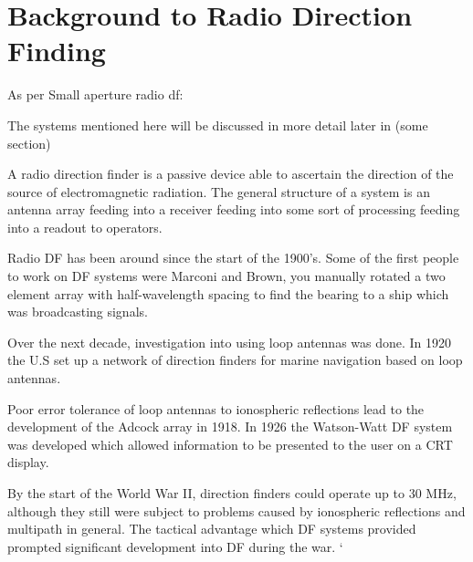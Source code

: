 \chapter{Background to Radio Direction Finding}
As per Small aperture radio df:

The systems mentioned here will be discussed in more detail later in (some section)

A radio direction finder is a passive device able to ascertain the direction of the source of electromagnetic radiation. 
The general structure of a system is an antenna array feeding into a receiver feeding into some sort of processing feeding into a readout to operators.

Radio DF has been around since the start of the 1900's. Some of the first people to work on DF  systems were Marconi and Brown, you manually rotated a two element array with half-wavelength spacing to find the bearing to a ship which was broadcasting signals. 

Over the next decade, investigation into using loop antennas was done. In 1920 the U.S set up a network of direction finders for marine navigation based on loop antennas.

Poor error tolerance of loop antennas to ionospheric reflections lead to the development of the Adcock array in 1918. 
In 1926 the Watson-Watt DF system was developed which allowed information to be presented to the user on a CRT display. 

By the start of  the World War II, direction finders could operate up to 30 MHz, although they still were subject to problems caused by ionospheric reflections and multipath in general. 
The tactical advantage which DF systems provided prompted significant development into DF during the war. `
